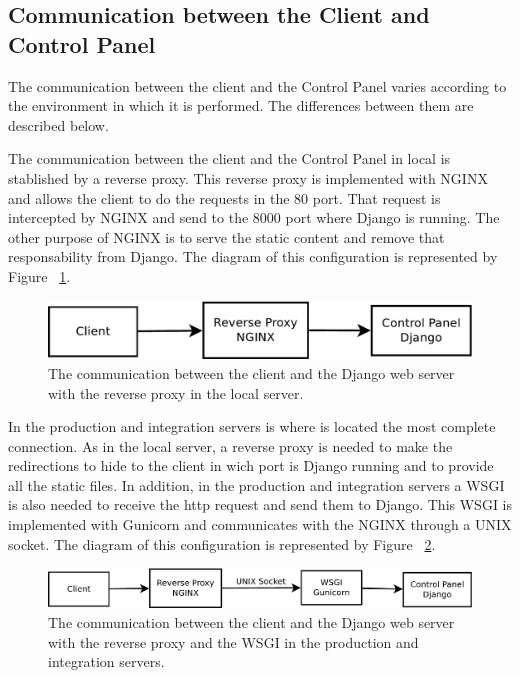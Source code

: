 \documentclass[a4paper,12pt]{article}
\begin{document}
\subsection{Communication between the Client and Control Panel}
The communication between the client and the Control Panel varies according to the environment in which it is performed.
The differences between them are described below.

The communication between the client and the Control Panel in local is stablished by a reverse proxy. This reverse proxy is implemented with
NGINX and allows the client to do the requests in the 80 port. That request is intercepted by NGINX and send to the 8000
port where Django is running. The other purpose of NGINX is to serve the static content and remove that responsability from Django.
The diagram of this configuration is represented by Figure ~\ref{fig:local_architecture}.

\begin{figure}[!ht]
    \centering
    \includegraphics[width=0.7\columnwidth]{images/local}
    \caption{The communication between the client and the Django web server with the reverse proxy in the local server.}
    \label{fig:local_architecture}
\end{figure}

In the production and integration servers is where is located the most complete connection. As in the local server, a reverse proxy is needed to
make the redirections to hide to the client in wich port is Django running and to provide all the static files. In addition, in the production
and integration servers a WSGI is also needed to receive the http request and send them to Django. This WSGI is implemented with Gunicorn and
communicates with the NGINX through a UNIX socket. The diagram of this configuration is represented by Figure ~\ref{fig:prod_int_architecture}.


\begin{figure}[!ht]
    \centering
    \includegraphics[width=1\columnwidth]{images/prod_int}
    \caption{The communication between the client and the Django web server with the reverse proxy and the WSGI in the production and integration servers.}
    \label{fig:prod_int_architecture}
\end{figure}
\end{document}

